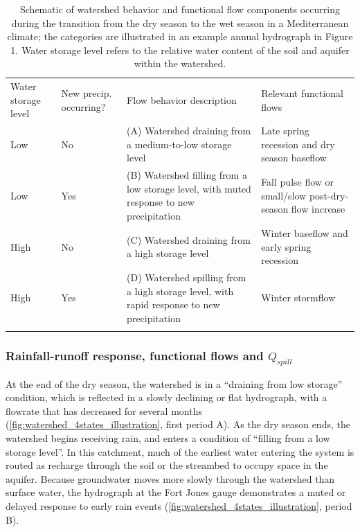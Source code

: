 \documentclass[hess, manuscript]{copernicus}
\begin{document}
\begin{table}[t]
\caption{Schematic of watershed behavior and functional flow components occurring during the transition from the dry season to the wet season in a Mediterranean climate; the categories are illustrated in an example annual hydrograph in Figure 1. Water storage level refers to the relative water content of the soil and aquifer within the watershed.}
\label{tab:watershed_modes_tab}
\begin{tabular}{p{1.8cm} p{1.6cm} p{4.8cm} p{5cm}}
\tophline
Water storage level & New precip. occurring? & Flow behavior description & Relevant functional flows \\
\middlehline
 Low & No & (A) Watershed draining from a medium-to-low storage level & Late spring recession and dry season baseflow \\ 
 \middlehline
Low & Yes & (B) Watershed filling from a low storage level, with muted response to new precipitation & Fall pulse flow or small/slow post-dry-season flow increase \\
\middlehline
High & No & (C) Watershed draining from a high storage level & Winter baseflow and early spring recession \\
\middlehline
High & Yes & (D) Watershed spilling from a high storage level, with rapid response to new precipitation & Winter stormflow\\
\bottomhline
\end{tabular}
\belowtable{}
\end{table}

\subsubsection{\texorpdfstring{Rainfall-runoff response, functional
flows and
\(Q_{spill}\)}{Rainfall-runoff response, functional flows and Q\_\{spill\}}}

At the end of the dry season, the watershed is in a ``draining from low
storage'' condition, which is reflected in a slowly declining or flat
hydrograph, with a flowrate that has decreased for several months
(\autoref{fig:watershed_4states_illustration}, first period A). As the
dry season ends, the watershed begins receiving rain, and enters a
condition of ``filling from a low storage level''. In this catchment,
much of the earliest water entering the system is routed as recharge
through the soil or the streambed to occupy space in the aquifer.
Because groundwater moves more slowly through the watershed than surface
water, the hydrograph at the Fort Jones gauge demonstrates a muted or
delayed response to early rain events
(\autoref{fig:watershed_4states_illustration}, period B).
\end{document}
